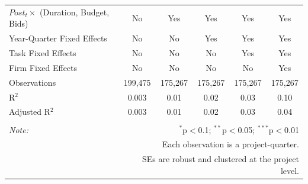 \documentclass[]{article}
\begin{document}
\begin{table}[H]
\begin{tabular}{@{\extracolsep{-2pt}}lccccc}
$Post_t \times $  (Duration, Budget, Bids) & No & Yes & Yes & Yes & Yes \\ 
Year-Quarter Fixed Effects & No & No & Yes & Yes & Yes \\ 
Task Fixed Effects & No & No & No & Yes & Yes \\ 
Firm Fixed Effects & No & No & No & No & Yes \\ 
Observations & 199,475 & 175,267 & 175,267 & 175,267 & 175,267 \\ 
R$^{2}$ & 0.003 & 0.01 & 0.02 & 0.03 & 0.10 \\ 
Adjusted R$^{2}$ & 0.003 & 0.01 & 0.02 & 0.03 & 0.04 \\ 
\hline 
\hline \\[-1.8ex] 
\textit{Note:}  & \multicolumn{5}{r}{$^{*}$p$<$0.1; $^{**}$p$<$0.05; $^{***}$p$<$0.01} \\ 
 & \multicolumn{5}{r}{Each observation is a project-quarter.} \\ 
 & \multicolumn{5}{r}{SEs are robust and clustered at the project level.} \\ 
\end{tabular} 
\end{table}
\end{document}
